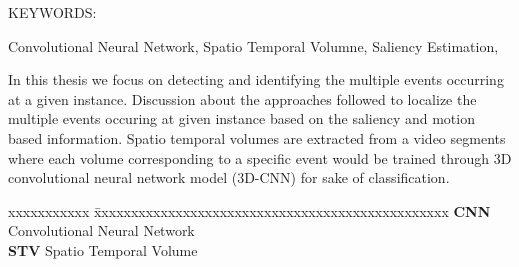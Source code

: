 \documentclass[MTech]{iitmdiss}
\begin{document}

\abstract

\noindent KEYWORDS: \hspace*{0.5em} \parbox[t]{4.4in}{Convolutional Neural Network, Spatio Temporal Volumne, Saliency Estimation,}

\vspace*{24pt}
In this thesis we focus on detecting and identifying the multiple events occurring at a given instance. Discussion about the approaches followed to localize the multiple events occuring at given instance based on the saliency and motion based information.
Spatio temporal volumes are extracted from a video segments where each volume corresponding to a specific event would be trained through 3D convolutional neural network model (3D-CNN) for sake of classification.
\pagebreak


\begin{singlespace}
\tableofcontents
\thispagestyle{empty}

\listoftables
{}
\listoffigures
{}
\end{singlespace}


\abbreviations
\noindent 
\begin{tabbing}
xxxxxxxxxxx \= xxxxxxxxxxxxxxxxxxxxxxxxxxxxxxxxxxxxxxxxxxxxxxxx \kill
\textbf{CNN}   \> Convolutional Neural Network \\
\textbf{STV} \> Spatio Temporal Volume \\
\end{tabbing}

\pagebreak


 
 
\end{document}
